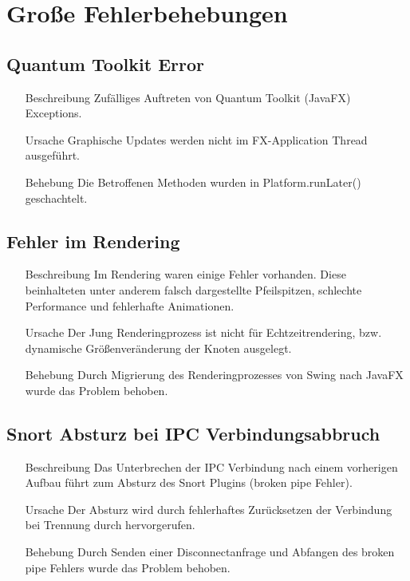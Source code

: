 \chapter{Große Fehlerbehebungen}


\section{Quantum Toolkit Error}

\begin{enumerate}
  \item[Beschreibung]
    Zufälliges Auftreten von Quantum Toolkit (JavaFX) Exceptions.
  \item[Ursache]
    Graphische Updates werden nicht im FX-Application Thread ausgeführt.
  \item[Behebung]
    Die Betroffenen Methoden wurden in Platform.runLater() geschachtelt.
\end{enumerate}

\section{Fehler im Rendering}

\begin{enumerate}
  \item[Beschreibung]
    Im Rendering waren einige Fehler vorhanden. Diese beinhalteten unter anderem falsch dargestellte Pfeilspitzen, schlechte Performance und fehlerhafte Animationen.
  \item[Ursache]
    Der Jung Renderingprozess ist nicht für Echtzeitrendering, bzw. dynamische Größenveränderung der Knoten ausgelegt.
  \item[Behebung]
    Durch Migrierung des Renderingprozesses von Swing nach JavaFX wurde das Problem behoben.
\end{enumerate}

\section{Snort Absturz bei IPC Verbindungsabbruch}

\begin{enumerate}
  \item[Beschreibung]
    Das Unterbrechen der IPC Verbindung nach einem vorherigen Aufbau führt zum Absturz des Snort Plugins (broken pipe Fehler).
  \item[Ursache]
    Der Absturz wird durch fehlerhaftes Zurücksetzen der Verbindung bei Trennung durch \programname hervorgerufen.
  \item[Behebung]
    Durch Senden einer Disconnectanfrage und Abfangen des broken pipe Fehlers wurde das Problem behoben.
\end{enumerate}